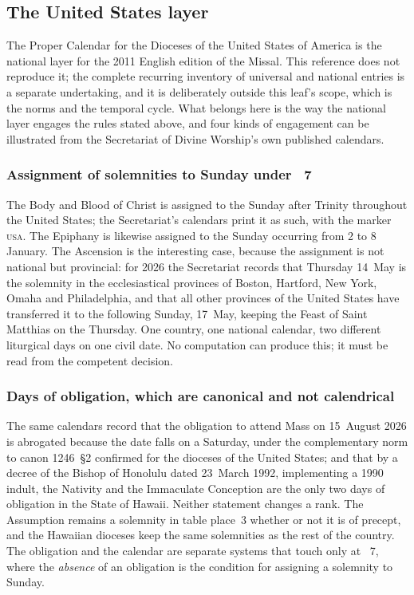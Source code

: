 \subsection{The United States layer}

The Proper Calendar for the Dioceses of the United States of America is the national layer for the
2011 English edition of the Missal. This reference does not reproduce it; the complete recurring
inventory of universal and national entries is a separate undertaking, and it is deliberately outside
this leaf's scope, which is the norms and the temporal cycle. What belongs here is the way the
national layer engages the rules stated above, and four kinds of engagement can be illustrated from
the Secretariat of Divine Worship's own published calendars.

\subsubsection{Assignment of solemnities to Sunday under ~7}

The Body and Blood of Christ is assigned to the Sunday after Trinity throughout the United States;
the Secretariat's calendars print it as such, with the marker \textsc{usa}. The Epiphany is likewise
assigned to the Sunday occurring from 2 to 8 January. The Ascension is the interesting case, because
the assignment is not national but provincial: for 2026 the Secretariat records that Thursday 14~May
is the solemnity in the ecclesiastical provinces of Boston, Hartford, New York, Omaha and
Philadelphia, and that all other provinces of the United States have transferred it to the following
Sunday, 17~May, keeping the Feast of Saint Matthias on the Thursday. One country, one national
calendar, two different liturgical days on one civil date. No computation can produce this; it must
be read from the competent decision.

\subsubsection{Days of obligation, which are canonical and not calendrical}

The same calendars record that the obligation to attend Mass on 15~August 2026 is abrogated because
the date falls on a Saturday, under the complementary norm to canon 1246~\S2 confirmed for the
dioceses of the United States; and that by a decree of the Bishop of Honolulu dated 23~March 1992,
implementing a 1990 indult, the Nativity and the Immaculate Conception are the only two days of
obligation in the State of Hawaii. Neither statement changes a rank. The Assumption remains a
solemnity in table place~3 whether or not it is of precept, and the Hawaiian dioceses keep the same
solemnities as the rest of the country. The obligation and the calendar are separate systems that
touch only at ~7, where the \emph{absence} of an obligation is the condition for
assigning a solemnity to Sunday.

